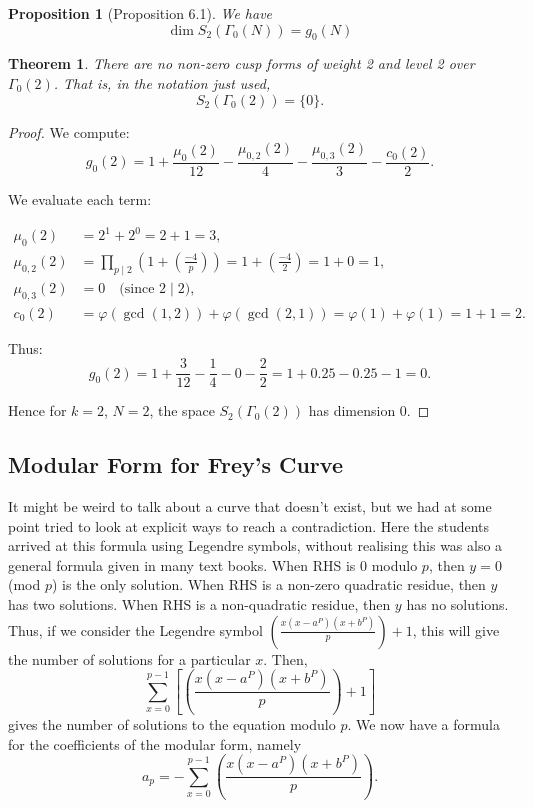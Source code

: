 \documentclass{article}
\newtheorem{thm}{Theorem}[section]
\newtheorem{prop}{Proposition}[section]
\theoremstyle{definition}
\theoremstyle{definition}
\theoremstyle{definition}
\begin{document}
\medskip

\begin{prop}[Proposition 6.1\cite{wstein}]
    We have 
    $$\dim S_2(\Gamma_0(N)) = g_0(N)$$
\end{prop} 

\begin{thm} There are no non-zero cusp forms of weight 2 and level 2 over $\Gamma_0(2)$. That is, in the notation just used,
$$S_2(\Gamma_0(2))=\{0\}.$$

    
\end{thm}
\begin{proof}

We compute:
\[
g_0(2) = 1 + \frac{\mu_0(2)}{12} - \frac{\mu_{0,2}(2)}{4} - \frac{\mu_{0,3}(2)}{3} - \frac{c_0(2)}{2}.
\]

We evaluate each term:

\begin{align*}
\mu_0(2) &= 2^1 + 2^0 = 2 + 1 = 3, \\
\mu_{0,2}(2) &= \prod_{p \mid 2} \left(1 + \left( \frac{-4}{p} \right) \right) = 1 + \left( \frac{-4}{2} \right) = 1 + 0 = 1, \\
\mu_{0,3}(2) &= 0 \quad \text{(since } 2 \mid 2), \\
c_0(2) &= \varphi(\gcd(1,2)) + \varphi(\gcd(2,1)) = \varphi(1) + \varphi(1) = 1 + 1 = 2.
\end{align*}

Thus:
\[
g_0(2) = 1 + \frac{3}{12} - \frac{1}{4} - 0 - \frac{2}{2} = 1 + 0.25 - 0.25 - 1 = 0.
\]

Hence for \( k = 2 \), \( N = 2 \), the space \( S_2(\Gamma_0(2)) \) has dimension 0.

\end{proof}




\subsection{Modular Form for Frey's Curve}
It might be weird to talk about a curve that doesn't exist, but we had at some point tried to look at explicit ways to reach a contradiction.
\newline\newline
Here the students arrived at this formula using Legendre symbols, without realising this was also a general formula given in many text books.
\newline\newline
When RHS is $0$ modulo $p$, then $y=0$ (mod $p$) is the only solution. When RHS is a non-zero quadratic residue, then $y$ has two solutions. When RHS is a non-quadratic residue, then $y$ has no solutions. Thus, if we consider the Legendre symbol $\left( \frac{x(x-a^P)(x+b^P)}{p} \right) + 1$, this will give the number of solutions for a particular $x$. Then, \[
\sum_{x = 0}^{p - 1} [\left( \frac{x(x-a^P)(x+b^P)}{p} \right) +1]
\]  gives the number of solutions to the equation modulo $p$. We now have a  formula for the coefficients of the modular form, namely 
$$a_p = -\sum_{x = 0}^{p - 1} \left( \frac{x(x-a^P)(x+b^P)}{p}\right).$$
\end{document}
